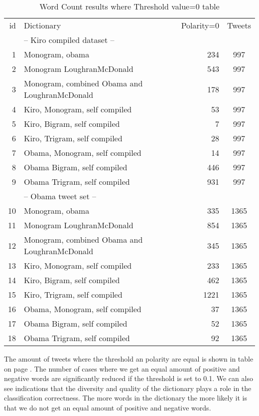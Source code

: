 \begin{table}
\centering
\label{tbl:word_counting_polarity_null}
\caption{Word Count results where Threshold value=0 table}
\begin{tabular}{ r p{6cm} r c }
id & Dictionary & Polarity=0 & Tweets \\
& -- Kiro compiled dataset -- & & \\
\hline
1 & Monogram, obama & 234 & 997 \\ 
2 & Monogram LoughranMcDonald & 543 & 997 \\ 
3 & Monogram, combined Obama and LoughranMcDonald & 178 & 997 \\
4 & Kiro, Monogram, self compiled & 53 & 997 \\
5 & Kiro, Bigram, self compiled & 7 & 997 \\
6 & Kiro, Trigram, self compiled & 28 & 997 \\
7 & Obama, Monogram, self compiled & 14 & 997 \\
8 & Obama Bigram, self compiled & 446 & 997 \\
9 & Obama Trigram, self compiled & 931 & 997 \\

& -- Obama tweet set -- & & \\
\hline
10 & Monogram, obama & 335 & 1365 \\ 
11 & Monogram LoughranMcDonald & 854 & 1365 \\
12 & Monogram, combined Obama and LoughranMcDonald & 345 & 1365 \\
13 & Kiro, Monogram, self compiled & 233 & 1365 \\
14 & Kiro, Bigram, self compiled & 462 & 1365 \\
15 & Kiro, Trigram, self compiled & 1221 & 1365 \\
16 & Obama, Monogram, self compiled & 37 & 1365 \\
17 & Obama Bigram, self compiled & 52 & 1365 \\
18 & Obama Trigram, self compiled & 92 & 1365 \\
\end{tabular}
\end{table}

The amount of tweets where the threshold an polarity are equal is shown in table
on page \pageref{tbl:word_counting_polarity_null}. The number of cases where we
get an equal amount of positive and negative words are significantly reduced if
the threshold is set to 0.1. We can also see indications that the diversity and
quality of the dictionary plays a role in the classification correctness. The
more words in the dictionary the more likely it is that we do not get an equal
amount of positive and negative words.  
%

